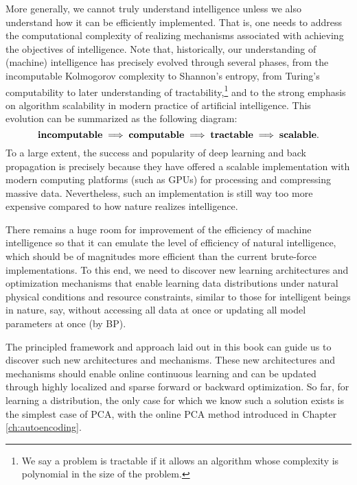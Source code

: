 \documentclass[../../book-main.tex]{subfiles}
\begin{document}
More generally, we cannot truly understand intelligence unless we also understand how it can be efficiently implemented. That is, one needs to address the computational complexity of realizing mechanisms associated with achieving the objectives of intelligence. Note that, historically, our understanding of (machine) intelligence has precisely evolved through several phases, from the incomputable Kolmogorov complexity to Shannon's entropy, from Turing's computability to later understanding of  tractability,\footnote{We say a problem is tractable if it allows an algorithm whose complexity is polynomial in the size of the problem.} and to the strong emphasis on algorithm scalability in modern practice of artificial intelligence. This evolution can be summarized as the following diagram:
\begin{equation}
   \mbox{\textbf{incomputable}} \;
   \Longrightarrow \; \mbox{\textbf{computable}} \;
   \Longrightarrow \; \mbox{\textbf{tractable}} \; \Longrightarrow \; 
   \mbox{\textbf{scalable}}.
\end{equation}
To a large extent, the success and popularity of deep learning and back propagation is precisely because they have offered a  scalable implementation with modern computing platforms (such as GPUs) for processing and compressing massive data. Nevertheless, such an implementation is still way too more expensive compared to how nature realizes intelligence. 

There remains a huge room for  improvement of the efficiency of   machine intelligence so that it can emulate the level of efficiency of natural intelligence, which should be of magnitudes more efficient than the current brute-force implementations. To this end, we need to discover new learning architectures and optimization mechanisms that enable learning data distributions under natural physical conditions and resource constraints, similar to those for intelligent beings in nature, say, without accessing all data at once or updating all model parameters  at once (by BP). 

The principled framework and approach laid out in this book can guide us to discover such new architectures and mechanisms.  These new architectures and mechanisms should enable online continuous learning and can be updated through highly localized and sparse forward or backward optimization. So far, for learning a distribution, the only case for which we know such a solution exists is the simplest case of PCA, with the online PCA method introduced in Chapter \ref{ch:autoencoding}.  
\end{document}
